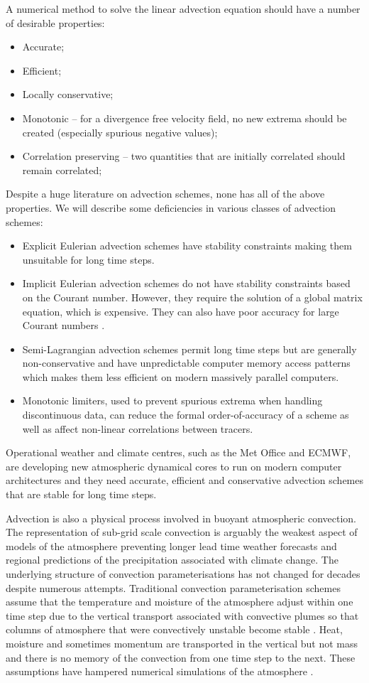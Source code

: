 A numerical method to solve the linear advection equation should have a number of desirable properties: 
\begin{itemize}
\item Accurate;
\item Efficient;
\item Locally conservative;
\item Monotonic -- for a divergence free velocity field, no new extrema should be created (especially spurious negative values);
\item Correlation preserving -- two quantities that are initially correlated should remain correlated; 
\end{itemize}
Despite a huge literature on advection schemes, none has all of the above properties. We will describe some deficiencies in various classes of advection schemes:
\begin{itemize}
    \item Explicit Eulerian advection schemes have stability constraints making them unsuitable for long time steps. 
    \item Implicit Eulerian advection schemes do not have stability constraints based on the Courant number. However, they require the solution of a global matrix equation, which is expensive. They can also have poor accuracy for large Courant numbers \cite[eg][]{CWPS17}. 
    \item Semi-Lagrangian advection schemes permit long time steps but are generally non-conservative and have unpredictable computer memory access patterns which makes them less efficient on modern massively parallel computers.  
    \item Monotonic limiters, used to prevent spurious extrema when handling discontinuous data, can reduce the formal order-of-accuracy of a scheme as well as affect non-linear correlations between tracers. 
\end{itemize}

Operational weather and climate centres, such as the Met Office and ECMWF, are developing new atmospheric dynamical cores to run on modern computer architectures and they need accurate, efficient and conservative advection schemes that are stable for long time steps.

Advection is also a physical process involved in buoyant atmospheric convection. The representation of sub-grid scale convection is  arguably the weakest aspect of models of the atmosphere \cite[]{ipcc41,LCD+08,SLF+10,HPB+14} preventing longer lead time weather forecasts and regional predictions of the precipitation associated with climate change. The underlying structure of convection parameterisations has not changed for decades \cite[]{HPB+14} despite numerous attempts. Traditional convection parameterisation schemes assume that the temperature and moisture of the atmosphere adjust within one time step due to the vertical transport associated with convective plumes so that columns of atmosphere that were convectively unstable become stable \cite[]{GR90}. Heat, moisture and sometimes momentum are transported in the vertical but not mass and there is no memory of the convection from one time step to the next. These assumptions have hampered numerical simulations of the atmosphere \cite[]{SLF+10}.


